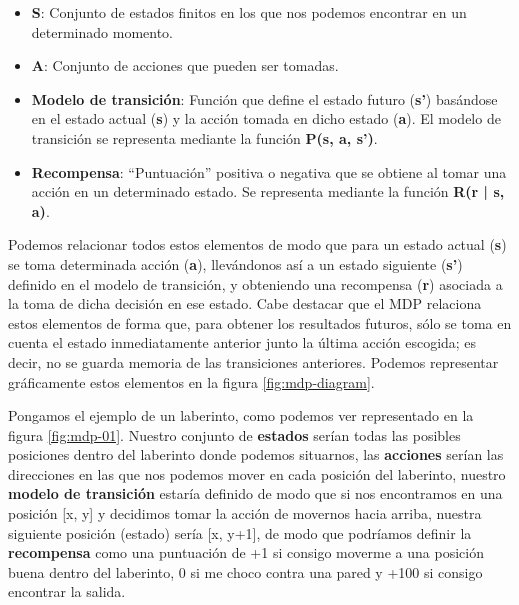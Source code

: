 \begin{itemize}
    \item \textbf{S}: Conjunto de estados finitos en los que nos podemos encontrar en un determinado momento.
    \item \textbf{A}: Conjunto de acciones que pueden ser tomadas.
    \item \textbf{Modelo de transición}: Función que define el estado futuro (\textbf{s'}) basándose en el estado actual (\textbf{s}) y la acción tomada en dicho estado (\textbf{a}). El modelo de transición se representa mediante la función \textbf{P(s, a, s’)}.
    \item \textbf{Recompensa}: “Puntuación” positiva o negativa que se obtiene al tomar una acción en un determinado estado. Se representa mediante la función \textbf{R(r | s, a)}.
\end{itemize}

Podemos relacionar todos estos elementos de modo que para un estado actual (\textbf{s}) se toma determinada acción (\textbf{a}), llevándonos así a un estado siguiente (\textbf{s'}) definido en el modelo de transición, y obteniendo una recompensa (\textbf{r}) asociada a la toma de dicha decisión en ese estado. Cabe destacar que el MDP relaciona estos elementos de forma que, para obtener los resultados futuros, sólo se toma en cuenta el estado inmediatamente anterior junto la última acción escogida; es decir, no se guarda memoria de las transiciones anteriores. Podemos representar gráficamente estos elementos en la figura \ref{fig:mdp-diagram}.


Pongamos el ejemplo de un laberinto, como podemos ver representado en la figura \ref{fig:mdp-01}. Nuestro conjunto de \textbf{estados} serían todas las posibles posiciones dentro del laberinto donde podemos situarnos, las \textbf{acciones} serían las direcciones en las que nos podemos mover en cada posición del laberinto, nuestro \textbf{modelo de transición} estaría definido de modo que si nos encontramos en una posición [x, y] y decidimos tomar la acción de movernos hacia arriba, nuestra siguiente posición (estado) sería [x, y+1], de modo que podríamos definir la \textbf{recompensa} como una puntuación de +1 si consigo moverme a una posición buena dentro del laberinto, 0 si me choco contra una pared y +100 si consigo encontrar la salida.


